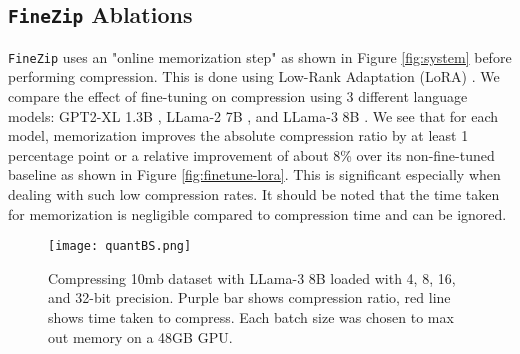 \documentclass[11pt]{article}
\begin{document}
\subsection{\texttt{FineZip} Ablations}

\texttt{FineZip} uses an "online memorization step" as shown in Figure \ref{fig:system} before performing compression. This is done using Low-Rank Adaptation (LoRA) \citep{hu2021lora}. We compare the effect of fine-tuning on compression using 3 different language models: GPT2-XL 1.3B \cite{gpt-2}, LLama-2 7B \cite{llama2}, and LLama-3 8B \cite{llama3}. We see that for each model, memorization improves the absolute compression ratio by at least 1 percentage point or a relative improvement of about 8\% over its non-fine-tuned baseline as shown in Figure \ref{fig:finetune-lora}. This is significant especially when dealing with such low compression rates. It should be noted that the time taken for memorization is negligible compared to compression time and can be ignored.


\begin{figure}
    \centering
    \texttt{[image: quantBS.png]} %
    \centering
    \caption{Compressing 10mb dataset with LLama-3 8B loaded with 4, 8, 16, and 32-bit precision. Purple bar shows compression ratio, red line shows time taken to compress. Each batch size was chosen to max out memory on a 48GB GPU.}
    \centering
    \label{fig:quantization}
    \centering
\end{figure}



\end{document}
